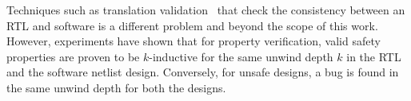 %
Techniques such as translation validation~\cite{DBLP:conf/tacas/PnueliSS98}  
that check the consistency between an RTL and software is a different problem 
and beyond the scope of this work.
%
However, experiments have shown that for 
property verification, valid safety properties are proven to be $k$-inductive for 
the same unwind depth $k$ in the RTL and the software netlist design.  Conversely, 
for unsafe designs, a bug is found in the same unwind depth for both the designs.

